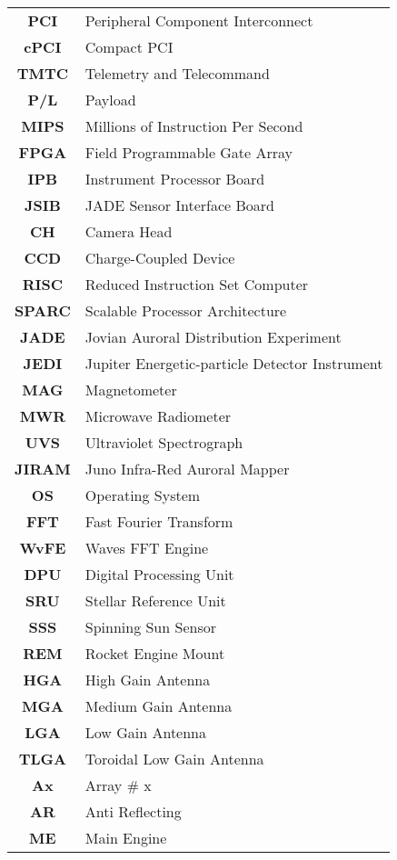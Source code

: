 \begin{multicols}{2}
{\begin{xltabular}{\linewidth}{c>{\raggedright\arraybackslash}X}
		\textbf{PCI} & Peripheral Component Interconnect \\
		\textbf{cPCI} & Compact PCI \\
		\textbf{TMTC} & Telemetry and Telecommand \\
		\textbf{P/L} & Payload \\
		\textbf{MIPS} & Millions of Instruction Per Second \\ 
		\textbf{FPGA} & Field Programmable Gate Array \\
		\textbf{IPB} & Instrument Processor Board \\
		\textbf{JSIB} & JADE Sensor Interface Board \\
		\textbf{CH} & Camera Head \\
		\textbf{CCD} & Charge-Coupled Device \\
		\textbf{RISC} & Reduced Instruction Set Computer \\
		\textbf{SPARC} & Scalable Processor Architecture \\
		\textbf{JADE} & Jovian Auroral Distribution Experiment \\
		\textbf{JEDI} & Jupiter Energetic-particle Detector Instrument \\
		\textbf{MAG} & Magnetometer \\
		\textbf{MWR} & Microwave Radiometer \\
		\textbf{UVS} & Ultraviolet Spectrograph \\
		\textbf{JIRAM} & Juno Infra-Red Auroral Mapper \\
		\textbf{OS} & Operating System \\
		\textbf{FFT} & Fast Fourier Transform \\
		\textbf{WvFE} & Waves FFT Engine \\
		\textbf{DPU} & Digital Processing Unit \\
		\textbf{SRU} & Stellar Reference Unit \\
		\textbf{SSS} & Spinning Sun Sensor \\
		\textbf{REM} & Rocket Engine Mount \\
		\textbf{HGA} & High Gain Antenna \\
		\textbf{MGA} & Medium Gain Antenna \\
		\textbf{LGA} & Low Gain Antenna \\
		\textbf{TLGA} & Toroidal Low Gain Antenna \\
		\textbf{Ax} & Array \# x \\
		\textbf{AR} & Anti Reflecting\\
		\textbf{ME} & Main Engine \\

\end{xltabular}}
\end{multicols}
